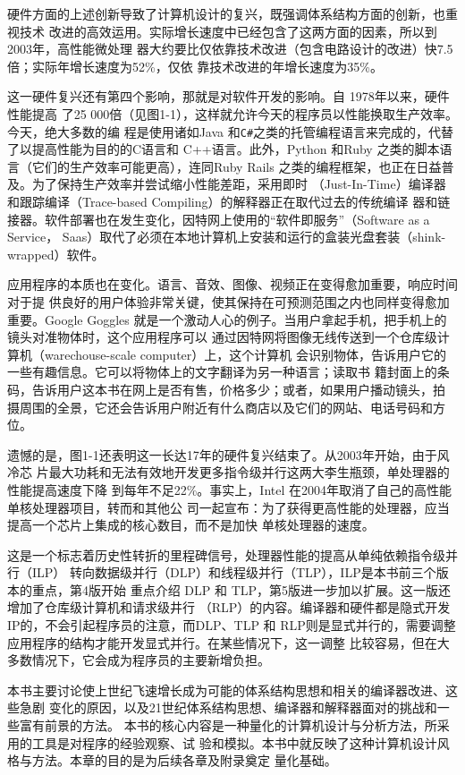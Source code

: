 硬件方面的上述创新导致了计算机设计的复兴，既强调体系结构方面的创新，也重视技术
改进的高效运用。实际增长速度中已经包含了这两方面的因素，所以到2003年，高性能微处理
器大约要比仅依靠技术改进（包含电路设计的改进）快7.5倍；实际年增长速度为52\%，仅依
靠技术改进的年增长速度为35\%。

这一硬件复兴还有第四个影响，那就是对软件开发的影响。自 1978年以来，硬件性能提高
了25 000倍（见图1-1），这样就允许今天的程序员以性能换取生产效率。今天，绝大多数的编
程是使用诸如Java 和\verb|C#|之类的托管编程语言来完成的，代替了以提高性能为目的的C语言和
C++语言。此外，Python 和Ruby 之类的脚本语言（它们的生产效率可能更高），连同Ruby Rails
之类的编程框架，也正在日益普及。为了保持生产效率并尝试缩小性能差距，采用即时
（Just-In-Time）编译器和跟踪编译（Trace-based Compiling）的解释器正在取代过去的传统编译
器和链接器。软件部署也在发生变化，因特网上使用的“软件即服务”（Software as a Service，
Saas）取代了必须在本地计算机上安装和运行的盒装光盘套装（shink-wrapped）软件。

应用程序的本质也在变化。语言、音效、图像、视频正在变得愈加重要，响应时间对于提
供良好的用户体验非常关键，使其保持在可预测范围之内也同样变得愈加重要。Google Goggles
就是一个激动人心的例子。当用户拿起手机，把手机上的镜头对准物体时，这个应用程序可以
通过因特网将图像无线传送到一个仓库级计算机（warechouse-scale computer）上，这个计算机
会识别物体，告诉用户它的一些有趣信息。它可以将物体上的文字翻译为另一种语言；读取书
籍封面上的条码，告诉用户这本书在网上是否有售，价格多少；或者，如果用户播动镜头，拍
摄周围的全景，它还会告诉用户附近有什么商店以及它们的网站、电话号码和方位。

遗憾的是，图1-1还表明这一长达17年的硬件复兴结束了。从2003年开始，由于风冷芯
片最大功耗和无法有效地开发更多指令级并行这两大李生瓶颈，单处理器的性能提高速度下降
到每年不足22\%。事实上，Intel 在2004年取消了自己的高性能单核处理器项目，转而和其他公
司一起宣布：为了获得更高性能的处理器，应当提高一个芯片上集成的核心数目，而不是加快
单核处理器的速度。

这是一个标志着历史性转折的里程碑信号，处理器性能的提高从单纯依赖指令级并行（ILP）
转向数据级并行（DLP）和线程级并行（TLP），ILP是本书前三个版本的重点，第4版开始
重点介绍 DLP 和 TLP，第5版进一步加以扩展。这一版还增加了仓库级计算机和请求级井行
（RLP）的内容。编译器和硬件都是隐式开发IP的，不会引起程序员的注意，而DLP、TLP 和
RLP则是显式并行的，需要调整应用程序的结构才能开发显式并行。在某些情况下，这一调整
比较容易，但在大多数情况下，它会成为程序员的主要新增负担。

本书主要讨论使上世纪飞速增长成为可能的体系结构思想和相关的编译器改进、这些急剧
变化的原因，以及21世纪体系结构思想、编译器和解释器面对的挑战和一些富有前景的方法。
本书的核心内容是一种量化的计算机设计与分析方法，所采用的工具是对程序的经验观察、试
验和模拟。本书中就反映了这种计算机设计风格与方法。本章的目的是为后续各章及附录奠定
量化基础。

